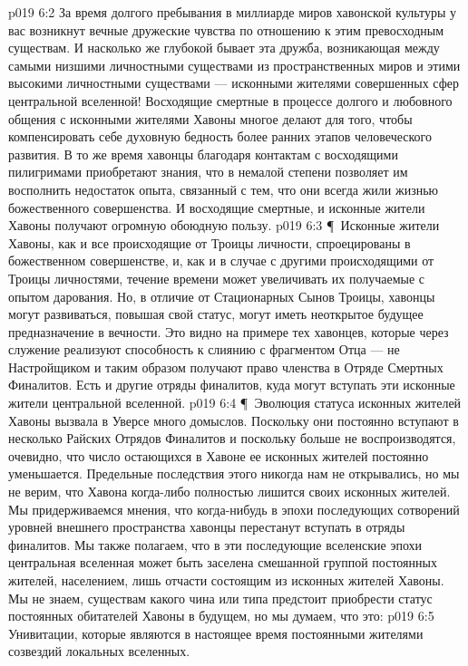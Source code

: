 \vs p019 6:2 За время долгого пребывания в миллиарде миров хавонской культуры у вас возникнут вечные дружеские чувства по отношению к этим превосходным существам. И насколько же глубокой бывает эта дружба, возникающая между самыми низшими личностными существами из пространственных миров и этими высокими личностными существами --- исконными жителями совершенных сфер центральной вселенной! Восходящие смертные в процессе долгого и любовного общения с исконными жителями Хавоны многое делают для того, чтобы компенсировать себе духовную бедность более ранних этапов человеческого развития. В то же время хавонцы благодаря контактам с восходящими пилигримами приобретают знания, что в немалой степени позволяет им восполнить недостаток опыта, связанный с тем, что они всегда жили жизнью божественного совершенства. И восходящие смертные, и исконные жители Хавоны получают огромную обоюдную пользу.
\vs p019 6:3 \P\ Исконные жители Хавоны, как и все происходящие от Троицы личности, спроецированы в божественном совершенстве, и, как и в случае с другими происходящими от Троицы личностями, течение времени может увеличивать их получаемые с опытом дарования. Но, в отличие от Стационарных Сынов Троицы, хавонцы могут развиваться, повышая свой статус, могут иметь неоткрытое будущее предназначение в вечности. Это видно на примере тех хавонцев, которые через служение реализуют способность к слиянию с фрагментом Отца --- не Настройщиком и таким образом получают право членства в Отряде Смертных Финалитов. Есть и другие отряды финалитов, куда могут вступать эти исконные жители центральной вселенной.
\vs p019 6:4 \P\ Эволюция статуса исконных жителей Хавоны вызвала в Уверсе много домыслов. Поскольку они постоянно вступают в несколько Райских Отрядов Финалитов и поскольку больше не воспроизводятся, очевидно, что число остающихся в Хавоне ее исконных жителей постоянно уменьшается. Предельные последствия этого никогда нам не открывались, но мы не верим, что Хавона когда\hyp{}либо полностью лишится своих исконных жителей. Мы придерживаемся мнения, что когда\hyp{}нибудь в эпохи последующих сотворений уровней внешнего пространства хавонцы перестанут вступать в отряды финалитов. Мы также полагаем, что в эти последующие вселенские эпохи центральная вселенная может быть заселена смешанной группой постоянных жителей, населением, лишь отчасти состоящим из исконных жителей Хавоны. Мы не знаем, существам какого чина или типа предстоит приобрести статус постоянных обитателей Хавоны в будущем, но мы думаем, что это:
\vs p019 6:5 \bibnobreakspace Унивитации, которые являются в настоящее время постоянными жителями созвездий локальных вселенных.
